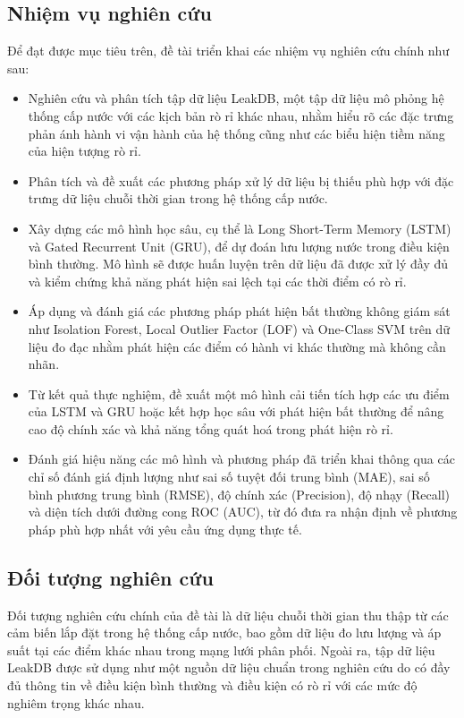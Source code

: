 \subsection{Nhiệm vụ nghiên cứu}
Để đạt được mục tiêu trên, đề tài triển khai các nhiệm vụ nghiên cứu chính như sau:
\begin{itemize}
    \item Nghiên cứu và phân tích tập dữ liệu LeakDB, một tập dữ liệu mô phỏng hệ thống cấp nước với các kịch bản rò rỉ khác nhau, nhằm hiểu rõ các đặc trưng phản ánh hành vi vận hành của hệ thống cũng như các biểu hiện tiềm năng của hiện tượng rò rỉ.
    
    \item Phân tích và đề xuất các phương pháp xử lý dữ liệu bị thiếu phù hợp với đặc trưng dữ liệu chuỗi thời gian trong hệ thống cấp nước.
    
    \item Xây dựng các mô hình học sâu, cụ thể là Long Short-Term Memory (LSTM) và Gated Recurrent Unit (GRU), để dự đoán lưu lượng nước trong điều kiện bình thường. Mô hình sẽ được huấn luyện trên dữ liệu đã được xử lý đầy đủ và kiểm chứng khả năng phát hiện sai lệch tại các thời điểm có rò rỉ.
    
    \item Áp dụng và đánh giá các phương pháp phát hiện bất thường không giám sát như Isolation Forest, Local Outlier Factor (LOF) và One-Class SVM trên dữ liệu đo đạc nhằm phát hiện các điểm có hành vi khác thường mà không cần nhãn.
    
    \item Từ kết quả thực nghiệm, đề xuất một mô hình cải tiến tích hợp các ưu điểm của LSTM và GRU hoặc kết hợp học sâu với phát hiện bất thường để nâng cao độ chính xác và khả năng tổng quát hoá trong phát hiện rò rỉ.
    
    \item Đánh giá hiệu năng các mô hình và phương pháp đã triển khai thông qua các chỉ số đánh giá định lượng như sai số tuyệt đối trung bình (MAE), sai số bình phương trung bình (RMSE), độ chính xác (Precision), độ nhạy (Recall) và diện tích dưới đường cong ROC (AUC), từ đó đưa ra nhận định về phương pháp phù hợp nhất với yêu cầu ứng dụng thực tế.
\end{itemize}

\subsection{Đối tượng nghiên cứu}
Đối tượng nghiên cứu chính của đề tài là dữ liệu chuỗi thời gian thu thập từ các cảm biến lắp đặt trong hệ thống cấp nước, bao gồm dữ liệu đo lưu lượng và áp suất tại các điểm khác nhau trong mạng lưới phân phối. Ngoài ra, tập dữ liệu LeakDB được sử dụng như một nguồn dữ liệu chuẩn trong nghiên cứu do có đầy đủ thông tin về điều kiện bình thường và điều kiện có rò rỉ với các mức độ nghiêm trọng khác nhau.

